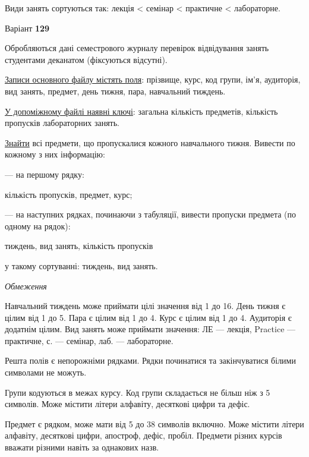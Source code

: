 \documentclass[11pt, ukrainian]{article}
\begin{document}
Види занять сортуються так: лекція < семінар < практичне < лабораторне.





\par
\newpage
{\center Варіант  \No \textbf { 129 }\par}
\bigskip
Обробляються дані семестрового журналу перевірок відвідування занять студентами деканатом (фіксуються відсутні). 

\underline{Записи основного файлу містять поля}: прізвище, курс, код групи, ім’я, аудиторія, вид занять, предмет, день тижня, пара, навчальний тиждень.

\underline{У допоміжному файлі наявні ключі}: загальна кількість предметів, кількість пропусків лабораторних занять.

\underline{Знайти} всі предмети, що пропускалися кожного навчального тижня. Вивести по кожному з них інформацію:\par
{\noindent}--- на першому рядку:\par
кількість пропусків, предмет, курс;

{\noindent}--- на наступних рядках, починаючи з табуляції, вивести пропуски предмета (по одному на рядок):\par
тиждень, вид занять, кількість пропусків

{\noindent}у такому сортуванні: тиждень, вид занять.


\bigskip\textit{Обмеження}

Навчальний тиждень може приймати цілі значення від 1 до 16.
День тижня є цілим від 1 до 5. Пара є цілим від 1 до 4.
Курс є цілим від 1 до 4. Аудиторія є додатнім цілим.
Вид занять може приймати значення:
ЛЕ --- лекція, Practice --- практичне, с. --- семінар, лаб. --- лабораторне.

Решта полів є непорожніми рядками.
Рядки починатися та закінчуватися білими символами не можуть.

Групи кодуються в межах курсу.
Код групи складається не більш ніж з 5 символів.
Може містити літери алфавіту, десяткові цифри та дефіс.

Предмет є рядком, може мати від 5 до 38 символів включно.
Може містити літери алфавіту, десяткові цифри, апостроф, дефіс, пробіл.
Предмети різних курсів вважати різними навіть за однакових назв.
\end{document}
